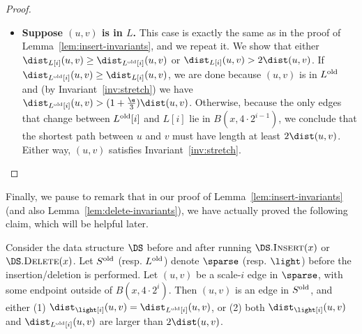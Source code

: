 \begin{proof}
\begin{itemize}
%
        It remains to show that if $(u,v) \in S \setminus S^{\rm old}$ then $u,v \in B(x, 4 \cdot 2^i)$. Because $(u,v)$ is a scale-$i$ edge of $S$, the endpoints $u$ and $v$ belong to $\e 2^i$-net of the net-tree $\net$. In other words, letting $i' \coloneqq \log(\e 2^i)$, both $u$ and $v$ belong to the net $N_{i'}$. Moreover, because $(u,v)$ is not in $S^{\rm old}$, one endpoint (WLOG $u$) is $N_{i'}^{\rm old}$ but not $N_{i'}$. By Lemma~\ref{lem:net-delete-local}, we have $\dist(u,x) \le 2^{i'}$. By triangle inequality, $\dist(v,x) \le 2^{i'} + 2^i < 2 \cdot 2^i$. We conclude that $u,v \in B(x, 4 \cdot 2^i)$ as desired.
        \item \textbf{\boldmath Suppose $(u,v)$ is in $L$.} This case is exactly the same as in the proof of Lemma~\ref{lem:insert-invariants}, and we repeat it. We show that either $\dist_{L[i]}(u,v) \ge \dist_{L^{\rm old}[i]}(u,v)$ or $\dist_{L[i]}(u,v) > 2 \dist(u,v)$.
        If $\dist_{L^{\rm old}[i]}(u,v) \ge \dist_{L[i]}(u,v)$, we are done because $(u,v)$ is in $L^{\rm old}$ and (by Invariant~\ref{inv:stretch}) we have $\dist_{L^{\rm old}[i]}(u,v) > (1+ \frac \e 3) \dist(u,v)$. Otherwise, because the only edges that change between $L^{\rm old}[i]$ and $L[i]$ lie in $B(x,4 \cdot 2^{i-1})$, we conclude that the shortest path between $u$ and $v$ must have length at least $2 \dist(u,v)$. Either way, $(u,v)$ satisfies Invariant~\ref{inv:stretch}.
    \aftermath
        \end{itemize}
\end{proof}
%
% 
%
Finally, we pause to remark that in our proof of Lemma~\ref{lem:insert-invariants} (and also Lemma~\ref{lem:delete-invariants}), we have actually proved the following claim, which will be helpful later.
\begin{lemma}
\label{lem:dist-unchanged}
Consider the data structure $\DS$ before and after running $\DS.\textsc{Insert}(x)$ or $\DS.\textsc{Delete}(x)$. Let $S^{\rm old}$ (resp. $L^{\rm old}$) denote $\sparse$ (resp. $\light$) before the insertion/deletion is performed.
Let $(u,v)$ be a scale-$i$ edge in $\sparse$, with some endpoint outside of $B(x, 4\cdot 2^i)$. Then $(u,v)$ is an edge in $S^{\rm old}$, and either (1)
$\dist_{\light[i]}(u,v) = \dist_{L^{\rm old}[i]}(u,v)$, or (2) both $\dist_{\light[i]}(u,v)$ and $\dist_{L^{\rm old}[i]}(u,v)$ are larger than $2 \dist(u,v)$.
\end{lemma}
%
%
